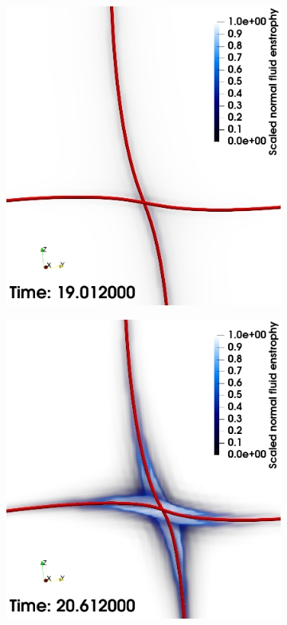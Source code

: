 \documentclass[%
 reprint,
 amsmath,amssymb,
 aps,
 prl,
]{revtex4-2}
\begin{document}
\begin{figure}[t]
	\centering
	\begin{subfigure}[b]{0.24\textwidth}
		\centering
		\includegraphics*[width=\textwidth]{snap-1.png}
	\end{subfigure}
	\begin{subfigure}[b]{0.24\textwidth}
		\centering
		\includegraphics*[width=\textwidth]{snap-2.png}

\end{subfigure}
\end{figure}
\end{document}
